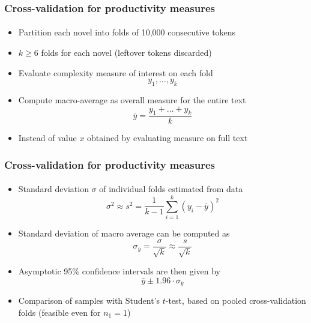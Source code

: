 \documentclass[t]{beamer} %
\begin{document}
\begin{frame}
  \frametitle{Cross-validation for productivity measures}
  \framesubtitle{\citep{Evert:Wankerl:Noeth:17}}

  \begin{itemize}
  \item Partition each novel into folds of 10,000 consecutive tokens
  \item[\So] $k \ge 6$ folds for each novel (leftover tokens discarded)
  \end{itemize}
  
  \begin{itemize}
  \item<2-> Evaluate complexity measure of interest on each fold
    \[ y_1, \dots, y_k \]
  \item<3-> Compute macro-average as overall measure for the entire text
    \[ \bar{y} = \frac{y_1+\dots + y_k}{k} \]
  \item<3-> Instead of value $x$ obtained by evaluating measure on full text
  \end{itemize}
\end{frame}

\begin{frame}
  \frametitle{Cross-validation for productivity measures}
  \framesubtitle{\citep{Evert:Wankerl:Noeth:17}}

  \begin{itemize}
  \item Standard deviation $\sigma$ of individual folds estimated from data
    \[ \sigma^2 \approx s^2 = \frac{1}{k - 1} \sum_{i=1}^k (y_i - \bar{y})^2 \]
  \item<2-> Standard deviation of macro average can be computed as
    \[ \sigma_{\bar{y}} = \frac{\sigma}{\sqrt{k}} \approx \frac{s}{\sqrt{k}} \]
  \item<3-> Asymptotic 95\% confidence intervals are then given by
    \[ \bar{y} \pm 1.96 \cdot \sigma_{\bar{y}} \]
  \item<4-> Comparison of samples with Student's $t$-test, based on pooled cross-validation folds
    (feasible even for $n_1 = 1$)
  \end{itemize}
\end{frame}
\end{document}
